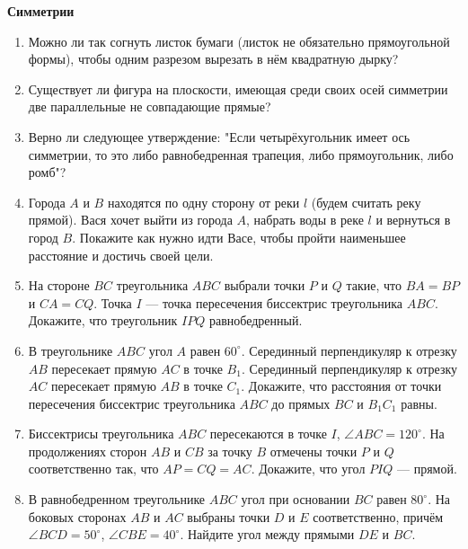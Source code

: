 \documentclass{article}
\begin{document}
\large


\begin{center}
\textbf{Симметрии}
\end{center}



\begin{enumerate}[label*=\protect\fbox{\arabic{enumi}}]

\item Можно ли так согнуть листок бумаги (листок не обязательно прямоугольной формы), чтобы одним разрезом вырезать в нём квадратную дырку?

\item Существует ли фигура на плоскости, имеющая среди своих осей симметрии две параллельные не совпадающие прямые?

\item Верно ли следующее утверждение: "Если четырёхугольник имеет ось симметрии, то это либо равнобедренная трапеция, либо прямоугольник, либо ромб"?

\item Города $A$ и $B$ находятся по одну сторону от реки $l$ (будем считать реку прямой). Вася хочет выйти из города $A$, набрать воды в реке $l$ и вернуться в город $B$. Покажите как нужно идти Васе, чтобы пройти наименьшее расстояние и достичь своей цели.

\item На стороне $BC$ треугольника $ABC$ выбрали точки $P$ и $Q$ такие, что $BA=BP$ и $CA=CQ$. Точка $I$ — точка пересечения биссектрис треугольника $ABC$. Докажите, что треугольник $IPQ$ равнобедренный.

\item  В треугольнике $ABC$ угол $A$ равен $60^\circ$. Серединный перпендикуляр к отрезку $AB$ пересекает прямую $AC$ в точке $B_1$. Серединный перпендикуляр к отрезку $AC$ пересекает прямую $AB$ в точке $C_1$. Докажите, что расстояния от точки пересечения биссектрис треугольника $ABC$ до прямых $BC$ и $B_1C_1$ равны.

\item Биссектрисы треугольника $ABC$ пересекаются в точке $I$, $\angle ABC=120^\circ$. На продолжениях сторон $AB$ и $CB$ за точку $B$ отмечены точки $P$ и $Q$ соответственно так, что $AP=CQ=AC$. Докажите, что угол $PIQ$ — прямой.

\item В равнобедренном треугольнике $ABC$ угол при основании $BC$ равен $80^\circ$. На боковых сторонах $AB$ и $AC$ выбраны точки $D$ и $E$ соответственно, причём $\angle BCD=50^\circ$, $\angle CBE=40^\circ$. Найдите угол между прямыми $DE$ и $BC$.


\end{enumerate}
\end{document}
